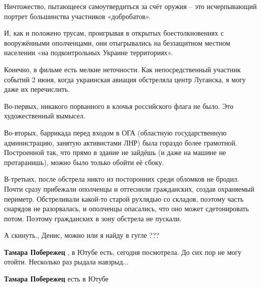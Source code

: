 \begin{itemize}
\begin{itemize}
Ничтожество, пытающееся самоутвердиться за счёт оружия – это исчерпывающий
портрет большинства участников «добробатов».

И, как и положено трусам, проигрывая в открытых боестолкновениях с вооружёнными
ополченцами, они отыгрывались на беззащитном местном населении «на
подконтрольных Украине территориях».

Конечно, в фильме есть мелкие неточности. Как непосредственный участник событий
2 июня, когда украинская авиация обстреляла центр Луганска, я могу даже их
перечислить.

Во-первых, никакого порванного в клочья российского флага не было. Это
художественный вымысел.

Во-вторых, баррикада перед входом в ОГА (областную государственную
администрацию, занятую активистами ЛНР) была гораздо более грамотной.
Построенной так, что прямо в здание не зайдёшь (и даже на машине не
протаранишь), можно было только обойти её сбоку.

В-третьих, после обстрела никто из посторонних среди обломков не бродил. Почти
сразу прибежали ополченцы и оттеснили гражданских, создав охраняемый периметр.
Обстреливали какой-то старой рухлядью со складов, поэтому часть снарядов не
разорвалась, и ополченцы опасались, что оно может сдетонировать потом. Поэтому
гражданских в зону обстрела не пускали.

 
А скинуть., Денис, можно или я найду в гугле ???

\begin{itemize}
 
\textbf{Тамара Побережец} , в Ютубе есть, сегодня посмотрела. До сих пор не могу отойти. Несколько раз рыдала навзрыд...

 
\textbf{Тамара Побережец} есть в Ютубе
\end{itemize}


\end{itemize}
\end{itemize}
